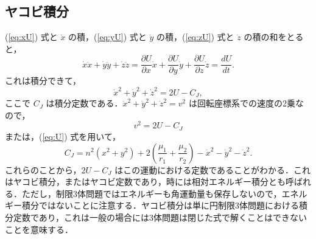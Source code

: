 \documentclass[11pt,a4paper,oneside,onecolumn]{jarticle}
\begin{document}
\subsection{ヤコビ積分}
(\ref{eq:xU}) 式と $\dot{x}$ の積，(\ref{eq:yU}) 式と $\dot{y}$ の積，(\ref{eq:zU}) 式と $\dot{z}$ の積の和をとると，
\begin{equation}
\dot{x} \ddot{x} + \dot{y} \ddot{y} + \dot{z} \ddot{z} = \frac{\partial U}{\partial x} \dot{x} + \frac{\partial U}{\partial y} \dot{y} + \frac{\partial U}{\partial z} \dot{z} = \frac{dU}{dt}.
\end{equation}
これは積分できて，
\begin{equation}
\dot{x}^2 + \dot{y}^2 + \dot{z}^2 = 2 U - C_J, \label{eq:2U-C_J}
\end{equation}
ここで $C_J$ は積分定数である．$\dot{x}^2 + \dot{y}^2 + \dot{z}^2 = v^2$ は回転座標系での速度の2乗なので，
\begin{equation}
v^2 = 2 U - C_J
\end{equation}
または，(\ref{eq:U}) 式を用いて，
\begin{equation}
C_J = n^2 (x^2 + y^2) + 2 \left( \frac{\mu_1}{r_1} + \frac{\mu_2}{r_2} \right) - \dot{x}^2 - \dot{y}^2 - \dot{z}^2.
\end{equation}
これらのことから，$2 U - C_J$ はこの運動における定数であることがわかる．これはヤコビ積分，またはヤコビ定数であり，時には相対エネルギー積分とも呼ばれる．ただし，制限3体問題ではエネルギーも角運動量も保存しないので，エネルギー積分ではないことに注意する．ヤコビ積分は単に円制限3体問題における積分定数であり，これは一般の場合には3体問題は閉じた式で解くことはできないことを意味する．
\end{document}
